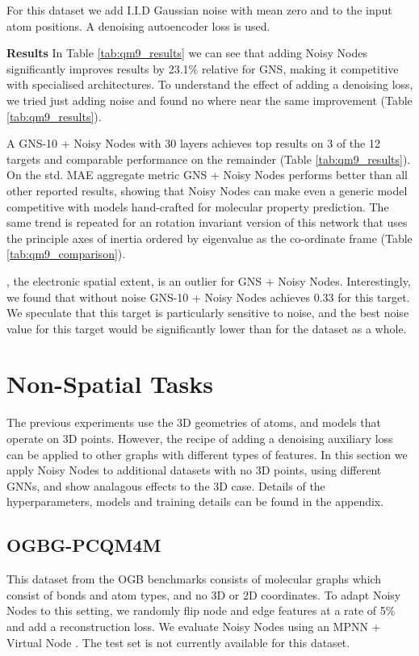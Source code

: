 \documentclass{article} \usepackage{iclr2022_conference,times}
\begin{document}
For this dataset we add I.I.D Gaussian noise with mean zero and  to the input atom positions. A denoising autoencoder loss is used.

\textbf{Results} In Table \ref{tab:qm9_results} we can see that adding Noisy Nodes significantly improves results by 23.1\% relative for GNS, making it competitive with specialised architectures. To understand the effect of adding a denoising loss, we tried just adding noise and found no where near the same improvement (Table \ref{tab:qm9_results}).

A GNS-10 + Noisy Nodes with 30 layers achieves top results on 3 of the 12 targets and comparable performance on the remainder (Table \ref{tab:qm9_results}). On the std. MAE aggregate metric GNS + Noisy Nodes performs better than all other reported results, showing that Noisy Nodes can make even a generic model competitive with models hand-crafted for molecular property prediction. The same trend is repeated for an rotation invariant version of this network that uses the principle axes of inertia ordered by eigenvalue as the co-ordinate frame (Table \ref{tab:qm9_comparison}).

, the electronic spatial extent, is an outlier for GNS + Noisy Nodes. Interestingly, we found that without noise GNS-10 + Noisy Nodes achieves 0.33 for this target. We speculate that this target is particularly sensitive to noise, and the best noise value for this target would be significantly lower than for the dataset as a whole.

\section{Non-Spatial Tasks}

The previous experiments use the 3D geometries of atoms, and models that operate on 3D points. However, the recipe of adding a denoising auxiliary loss can be applied to other graphs with different types of features. In this section we apply Noisy Nodes to additional datasets with no 3D points, using different GNNs, and show analagous effects to the 3D case. Details of the hyperparameters, models and training details can be found in the appendix.

\subsection{OGBG-PCQM4M}

This dataset from the OGB benchmarks consists of molecular graphs which consist of bonds and atom types, and no 3D or 2D coordinates. To adapt Noisy Nodes to this setting, we randomly flip node and edge features at a rate of 5\% and add a reconstruction loss. We evaluate Noisy Nodes using an MPNN  + Virtual Node \citep{Gilmer2017NeuralMP}. The test set is not currently available for this dataset.
\end{document}
